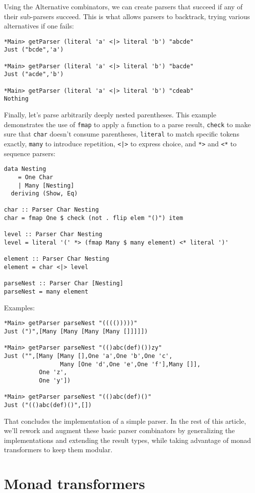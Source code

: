 \documentclass{tmr}
\begin{document}
Using the Alternative combinators, we can create parsers that succeed if any of
their sub-parsers succeed.  This is what allows parsers to backtrack, trying
various alternatives if one fails:
\begin{verbatim}
*Main> getParser (literal 'a' <|> literal 'b') "abcde"
Just ("bcde",'a')

*Main> getParser (literal 'a' <|> literal 'b') "bacde"
Just ("acde",'b')

*Main> getParser (literal 'a' <|> literal 'b') "cdeab"
Nothing
\end{verbatim}
Finally, let's parse arbitrarily deeply nested parentheses.  This example 
demonstrates the use of \verb+fmap+ to apply a function to a parse result, 
\verb+check+ to make sure that \verb+char+ doesn't consume parentheses,
\verb+literal+ to match specific tokens exactly, \verb+many+ to introduce
repetition, \verb+<|>+ to express choice, and \verb+*>+ 
and \verb+<*+ to sequence parsers:
\begin{verbatim}
data Nesting
    = One Char
    | Many [Nesting]
  deriving (Show, Eq)
  
char :: Parser Char Nesting
char = fmap One $ check (not . flip elem "()") item

level :: Parser Char Nesting
level = literal '(' *> (fmap Many $ many element) <* literal ')'

element :: Parser Char Nesting
element = char <|> level

parseNest :: Parser Char [Nesting]
parseNest = many element
\end{verbatim}
Examples:
\begin{verbatim}
*Main> getParser parseNest "(((()))))"
Just (")",[Many [Many [Many [Many []]]]])

*Main> getParser parseNest "(()abc(def)())zy"
Just ("",[Many [Many [],One 'a',One 'b',One 'c',
                Many [One 'd',One 'e',One 'f'],Many []],
          One 'z',
          One 'y'])

*Main> getParser parseNest "(()abc(def)()"
Just ("(()abc(def)()",[])
\end{verbatim}
That concludes the implementation of a simple parser.
In the rest of this article, we'll rework and augment these basic parser 
combinators by generalizing the implementations and extending the result types,
while taking advantage of monad transformers to keep them modular.




\section{Monad transformers}
\end{document}
